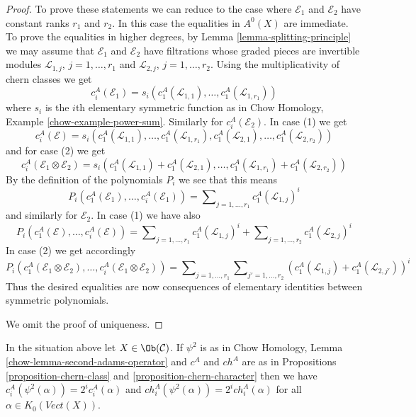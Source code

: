 \begin{proof}
\medskip\noindent
To prove these statements we can reduce to the case where $\mathcal{E}_1$
and $\mathcal{E}_2$ have constant ranks $r_1$ and $r_2$. In this case the
equalities in $A^0(X)$ are immediate. To prove the equalities in higher
degrees, by Lemma \ref{lemma-splitting-principle} we may
assume that $\mathcal{E}_1$ and $\mathcal{E}_2$ have filtrations
whose graded pieces are invertible modules
$\mathcal{L}_{1, j}$, $j = 1, \ldots, r_1$ and
$\mathcal{L}_{2, j}$, $j = 1, \ldots, r_2$.
Using the multiplicativity of chern classes we get
$$
c_i^A(\mathcal{E}_1) =
s_i(c_1^A(\mathcal{L}_{1, 1}), \ldots, c_1^A(\mathcal{L}_{1, r_1}))
$$
where $s_i$ is the $i$th elementary symmetric function as in
Chow Homology, Example \ref{chow-example-power-sum}.
Similarly for $c_i^A(\mathcal{E}_2)$. In case (1) we get
$$
c_i^A(\mathcal{E}) =
s_i(c_1^A(\mathcal{L}_{1, 1}), \ldots, c_1^A(\mathcal{L}_{1, r_1}),
c_1^A(\mathcal{L}_{2, 1}), \ldots, c_1^A(\mathcal{L}_{2, r_2}))
$$
and for case (2) we get
$$
c_i^A(\mathcal{E}_1 \otimes \mathcal{E}_2) =
s_i(c_1^A(\mathcal{L}_{1, 1}) + c_1^A(\mathcal{L}_{2, 1}),
\ldots, c_1^A(\mathcal{L}_{1, r_1}) + c_1^A(\mathcal{L}_{2, r_2}))
$$
By the definition of the polynomials $P_i$ we see that this means
$$
P_i(c^A_1(\mathcal{E}_1), \ldots, c^A_i(\mathcal{E}_1)) =
\sum\nolimits_{j = 1, \ldots, r_1} c_1^A(\mathcal{L}_{1, j})^i
$$
and similarly for $\mathcal{E}_2$. In case (1) we have also
$$
P_i(c^A_1(\mathcal{E}), \ldots, c^A_i(\mathcal{E})) =
\sum\nolimits_{j = 1, \ldots, r_1} c_1^A(\mathcal{L}_{1, j})^i +
\sum\nolimits_{j = 1, \ldots, r_2} c_1^A(\mathcal{L}_{2, j})^i
$$
In case (2) we get accordingly
$$
P_i(c^A_1(\mathcal{E}_1 \otimes \mathcal{E}_2), \ldots,
c^A_i(\mathcal{E}_1 \otimes \mathcal{E}_2)) =
\sum\nolimits_{j = 1, \ldots, r_1}
\sum\nolimits_{j' = 1, \ldots, r_2}
(c_1^A(\mathcal{L}_{1, j}) + c_1^A(\mathcal{L}_{2, j'}))^i
$$
Thus the desired equalities are now consequences of elementary
identities between symmetric polynomials.

\medskip\noindent
We omit the proof of uniqueness.
\end{proof}

\begin{lemma}
\label{lemma-adams-and-chern}
In the situation above let $X \in \Ob(\mathcal{C})$.
If $\psi^2$ is as in
Chow Homology, Lemma \ref{chow-lemma-second-adams-operator}
and $c^A$ and $ch^A$ are as in
Propositions \ref{proposition-chern-class} and
\ref{proposition-chern-character}
then we have $c^A_i(\psi^2(\alpha)) = 2^i c^A_i(\alpha)$ and
$ch^A_i(\psi^2(\alpha)) = 2^i ch^A_i(\alpha)$
for all $\alpha \in K_0(\textit{Vect}(X))$.
\end{lemma}

